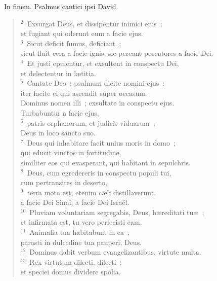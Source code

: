 ~\lettrine[lines=10,image=true,loversize=0.05,lraise=-0.03]{I}{}n finem. Psalmus cantici ipsi David.
\begin{flushleft}\begin{verse}\vspace{6pt}${}^{2}$~Exsurgat Deus, et dissipentur inimici ejus~;\\ et fugiant qui oderunt eum a facie ejus.\\
${}^{3}$~Sicut deficit fumus, deficiant~;\\ sicut fluit cera a facie ignis, sic pereant peccatores a facie Dei.\\
${}^{4}$~Et justi epulentur, et exsultent in conspectu Dei,\\ et delectentur in l\ae titia.\\
${}^{5}$~Cantate Deo~; psalmum dicite nomini ejus~:\\ iter facite ei qui ascendit super occasum.\\ Dominus nomen illi~; exsultate in conspectu ejus.\\ Turbabuntur a facie ejus,\\
${}^{6}$~patris orphanorum, et judicis viduarum~;\\ Deus in loco sancto suo.\\
${}^{7}$~Deus qui inhabitare facit unius moris in domo~;\\ qui educit vinctos in fortitudine,\\ similiter eos qui exasperant, qui habitant in sepulchris.\\
${}^{8}$~Deus, cum egredereris in conspectu populi tui,\\ cum pertransires in deserto,\\
${}^{9}$~terra mota est, etenim c\ae li distillaverunt,\\ a facie Dei Sinai, a facie Dei Isra\"el.\\
${}^{10}$~Pluviam voluntariam segregabis, Deus, h\ae reditati tu\ae~;\\ et infirmata est, tu vero perfecisti eam.\\
${}^{11}$~Animalia tua habitabunt in ea~;\\ parasti in dulcedine tua pauperi, Deus.\\
${}^{12}$~Dominus dabit verbum evangelizantibus, virtute multa.\\
${}^{13}$~Rex virtutum dilecti, dilecti~;\\ et speciei domus dividere spolia.\\

\end{verse}
\end{flushleft}
